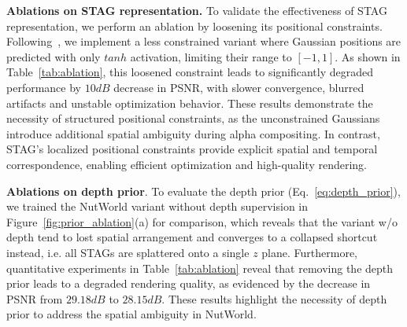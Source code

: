 \begin{table}[h!]
\setlength{\abovecaptionskip}{0.1cm}
\setlength{\belowcaptionskip}{0cm}
\vspace{-4mm}
  \centering
  \setlength{\tabcolsep}{8pt}  
  \renewcommand{\arraystretch}{1.2}  
  \caption{Ablation study on component-wise contribution. $n$ represents the number of upsampler blocks.} 
  \label{tab:ablation}
  \vspace{-4mm}
  \end{table}

\noindent \textbf{Ablations on STAG representation.}
To validate the effectiveness of STAG representation, we perform an ablation by loosening its positional constraints. Following~\cite{tang2025lgm}, we implement a less constrained variant where Gaussian positions are predicted with only $tanh$ activation, limiting their range to $[-1, 1]$. As shown in Table~\ref{tab:ablation}, this loosened constraint leads to significantly degraded performance by \underline{$10dB$} decrease in PSNR, with slower convergence, blurred artifacts and unstable optimization behavior.
These results demonstrate the necessity of structured positional constraints, as the unconstrained Gaussians introduce additional spatial ambiguity during alpha compositing. In contrast, STAG's localized positional constraints provide explicit spatial and temporal correspondence, enabling efficient optimization and high-quality rendering.


\noindent\textbf{Ablations on depth prior}. To evaluate the depth prior (Eq.~\ref{eq:depth_prior}), we trained the NutWorld variant without depth supervision in Figure~\ref{fig:prior_ablation}(a) for comparison, which reveals that the variant w/o depth tend to lost spatial arrangement and converges to a collapsed shortcut instead, i.e. all STAGs are splattered onto a single $z$ plane. Furthermore, quantitative experiments in Table~\ref{tab:ablation} reveal that removing the depth prior leads to a degraded rendering quality, as evidenced by the decrease in PSNR from $29.18 dB$ to $28.15 dB$. These results highlight the necessity of depth prior to address the spatial ambiguity in NutWorld.

